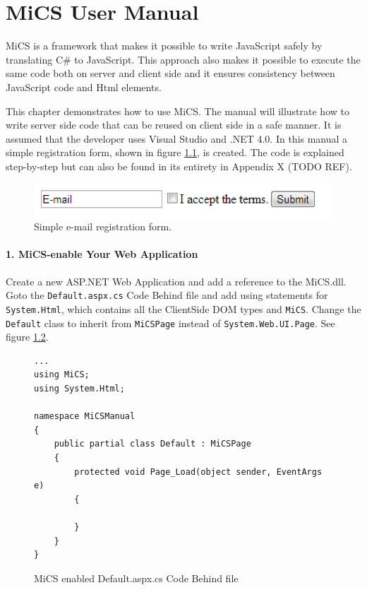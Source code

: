 \chapter{MiCS User Manual}
\label{chap:mics_manual}
MiCS is a framework that makes it possible to write JavaScript safely by translating C\# to JavaScript. This approach also makes it possible to execute the same code both on server and client side and it ensures consistency between JavaScript code and Html elements.

This chapter demonstrates how to use MiCS. The manual will illustrate how to write server side code that can be reused on client side in a safe manner. It is assumed that the developer uses Visual Studio and .NET 4.0. In this manual a simple registration form, shown in figure \ref{fig:manual_registrationform}, is created. The code is explained step-by-step but can also be found in its entirety in Appendix X (TODO REF).


\begin{figure}[H]
	\begin{center}
		\centerline{\includegraphics[width=12cm]{resources/images/manual_registrationform.png}}
	\end{center}
	\caption{Simple e-mail registration form.}
	\label{fig:manual_registrationform}
\end{figure}


\subsubsection{1. MiCS-enable Your Web Application} %
\label{ssub:mics_enable_your_web_application}
Create a new ASP.NET Web Application and add a reference to the MiCS.dll. Goto the \texttt{Default.aspx.cs} Code Behind file and add using statements for \texttt{System.Html}, which contains all the ClientSide DOM types and \texttt{MiCS}. Change the \texttt{Default} class to inherit from \texttt{MiCSPage} instead of \texttt{System.Web.UI.Page}. See figure \ref{fig:mics_enable_web_application}.
\begin{figure}[H]
\begin{lstlisting}[language=CSharp,classoffset=1,morekeywords={Default,MiCSPage,Button,CheckBox,TextBox,EventArgs,ClientSide,InputElement,Document,CheckBoxElement,Window,MixedSide,Regex}]
...
using MiCS;
using System.Html;

namespace MiCSManual
{
    public partial class Default : MiCSPage
    {
        protected void Page_Load(object sender, EventArgs e)
        {
   
        }
    }
}
\end{lstlisting}
\caption{MiCS enabled Default.aspx.cs Code Behind file}
\label{fig:mics_enable_web_application}
\end{figure}


